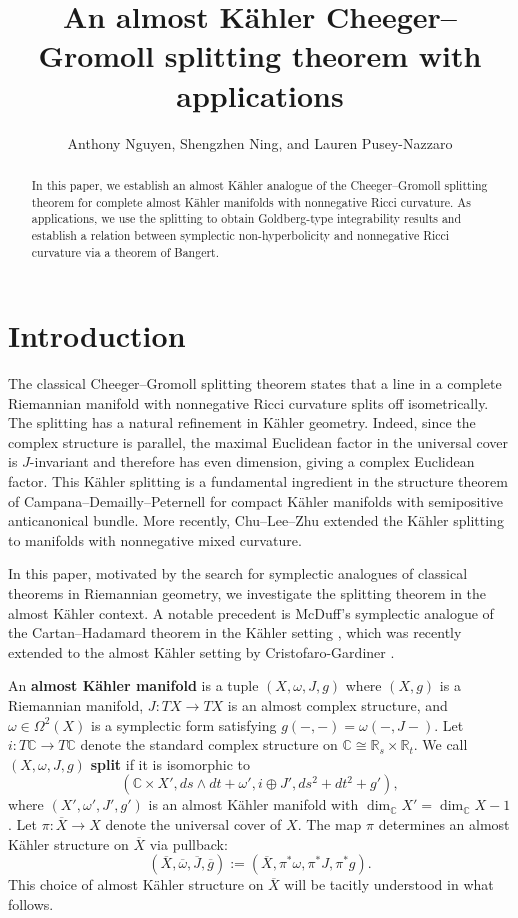 \documentclass[11pt,twoside]{amsart}
\title{An almost K\"ahler Cheeger--Gromoll splitting theorem with applications}
\author{Anthony Nguyen, Shengzhen Ning, and Lauren Pusey-Nazzaro}
\newcommand{\R}{\mathbb{R}}
\newcommand{\C}{\mathbb{C}}
\begin{document}
\begin{abstract}
In this paper, we establish an almost K\"ahler analogue of the Cheeger--Gromoll splitting theorem for complete almost K\"ahler manifolds with nonnegative Ricci curvature. As applications, we use the splitting to obtain Goldberg-type integrability results and establish a relation between symplectic non-hyperbolicity and nonnegative Ricci curvature via a theorem of Bangert.
\end{abstract}
\maketitle




\section{Introduction}\label{sec:intro}
The classical Cheeger--Gromoll splitting theorem
\cite{CGsplitting} states that a line in a complete Riemannian manifold with nonnegative Ricci curvature splits off isometrically. The splitting has a natural refinement in K\"ahler geometry. Indeed, since the complex structure is parallel, the maximal Euclidean factor in the universal cover is $J$-invariant and therefore has even dimension, giving a complex Euclidean factor. This K\"ahler splitting is a fundamental ingredient in the structure theorem of Campana--Demailly--Peternell \cite{CDP15} for compact K\"ahler manifolds with semipositive anticanonical bundle. More recently, Chu--Lee--Zhu \cite{ChuLeeZhu} extended the K\"ahler splitting to manifolds with nonnegative mixed curvature.

In this paper, motivated by the search for symplectic analogues of classical theorems in Riemannian geometry, we investigate the splitting theorem in the almost K\"ahler context. A notable precedent is McDuff's symplectic analogue of the Cartan--Hadamard theorem in the K\"ahler setting \cite{McDuff88}, which was recently extended to the almost K\"ahler setting by Cristofaro-Gardiner \cite{DCG26}. 

An {\bf almost K\"ahler manifold} is a tuple $(X,\omega,J,g)$ where $(X,g)$ is a Riemannian manifold, $J\colon TX \to TX$ is an almost complex structure, and $\omega \in \Omega^2(X)$ is a symplectic form satisfying $g(-,-) = \omega(-,J-)$. 
Let $i\colon T\C \to T\C$ denote the standard complex structure on $\C \cong \R_s \times \R_t$. We call $(X,\omega, J, g)$ {\bf split} if it is isomorphic to 
\[ 
(\C \times X', ds \wedge dt + \omega',i\oplus J', ds^2 + dt^2 + g'),
\]
where $(X',\omega',J',g')$ is an almost K\"ahler manifold with $\dim_{\C}X'=\dim_{\C}X-1$.
Let $\pi \colon \overline X \to X$ denote the universal cover of $X$. The map $\pi$ determines an almost K\"ahler structure on $\overline X$ via pullback:
\[
(\overline X, \overline \omega, \overline J, \overline g):= (\overline X, \pi^* \omega, \pi^*J, \pi^* g).
\]
This choice of almost K\"ahler structure on $\overline X$ will be tacitly understood in what follows.
\end{document}
